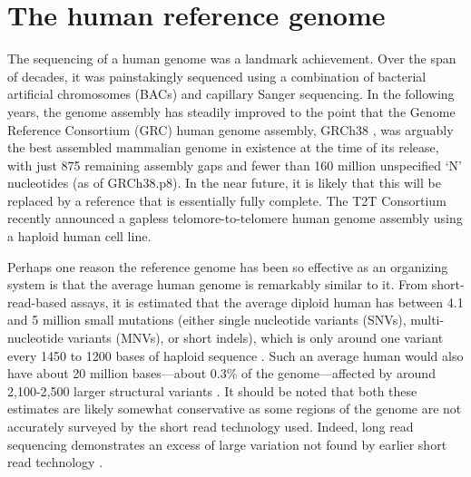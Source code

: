 \documentclass[11pt]{ucthesis}
\begin{document}
\section{The human reference genome}

The sequencing of a human genome was a landmark achievement. Over the span of decades, it was painstakingly sequenced using a combination of bacterial artificial chromosomes (BACs) and capillary Sanger sequencing\cite{lander2001initial}. In the following years, the genome assembly has steadily improved \cite{international2004finishing,church2011modernizing} to the point that the Genome Reference Consortium (GRC) human genome assembly, GRCh38 \cite{schneider2016evaluation}, was arguably the best assembled mammalian genome in existence at the time of its release, with just 875 remaining assembly gaps and fewer than 160 million unspecified `N' nucleotides (as of GRCh38.p8). In the near future, it is likely that this will be replaced by a reference that is essentially fully complete. The T2T Consortium recently announced a gapless telomore-to-telomere human genome assembly using a haploid human cell line\cite{nurk2021complete}. 



Perhaps one reason the reference genome has been so effective as an organizing system is that the average human genome is remarkably similar to it. From short-read-based assays, it is estimated that the average diploid human has between 4.1 and 5 million small mutations (either single nucleotide variants (SNVs), multi-nucleotide variants (MNVs), or short indels), which is only around one variant every 1450 to 1200 bases of haploid sequence \cite{10002015global}. Such an average human would also have about 20 million bases---about 0.3\% of the genome---affected by around 2,100-2,500 larger structural variants \cite{10002015global}. It should be noted that both these estimates are likely somewhat conservative as some regions of the genome are not accurately surveyed by the short read technology used. Indeed, long read sequencing demonstrates an excess of large variation not found by earlier short read technology \cite{chaisson2015resolving,seo2016novo}.
\end{document}

